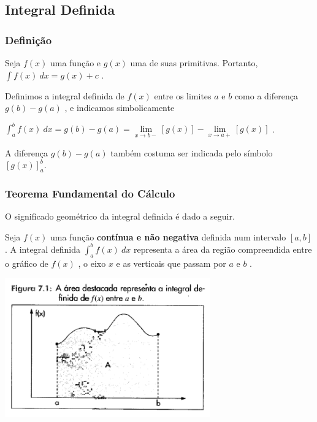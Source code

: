 	\subsection{Integral Definida \cite{morettin}}

		\subsubsection{Definição \cite{morettin}}
	
			Seja $ f(x) $ uma função e $ g(x) $ uma de suas primitivas. Portanto, $ \int f(x) \ dx = g(x) + c $ .

			Definimos a integral definida de $ f(x) $ entre os limites $ a $ e $ b $ como a diferença $ g(b) - g(a) $ , e indicamos simbolicamente
			
			\bigskip

			{\LARGE $ \int_{a}^{b} f(x) \ dx = g(b) - g(a) = \lim \limits_{x \to b-} [g(x)] - \lim \limits_{x \to a+} [g(x)] $} .

			\bigskip

			A diferença $ g(b) - g(a) $ também costuma ser indicada pelo símbolo $ [g(x)]_{a}^{b} $.
	
		\subsubsection{Teorema Fundamental do Cálculo \cite{morettin}}
	
			O significado geométrico da integral definida é dado a seguir.

			Seja $ f(x) $ uma função \textbf{contínua e não negativa} definida num intervalo $ [a, b] $ . A integral definida $ \int_{a}^{b} f(x) \ dx $ representa a área da região compreendida entre o gráfico de $ f(x) $ , o eixo $ x $ e as verticais que passam por $ a $ e $ b $ .

			\bigskip

			\includegraphics[height=6cm]{images/morettin_figura-7-1}


